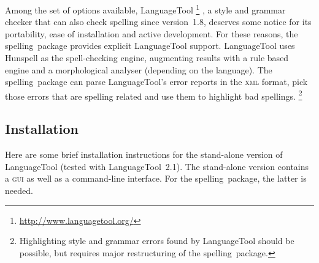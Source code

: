 \documentclass[11pt]{article}
\newcommand*{\pkg}{\textsf{spelling}}
\newcommand*{\acr}[1]{\mbox{\scshape#1}}
\begin{document}
Among the set of options available, LanguageTool%
\footnote{\url{http://www.languagetool.org/}}%
%
, a style and grammar checker that can also check spelling since
version~1.8, deserves some notice for its portability, ease of
installation and active development.  For these reasons, the \pkg\
package provides explicit LanguageTool support.  LanguageTool uses
Hunspell as the spell-checking engine, augmenting results with a rule
based engine and a morphological analyser (depending on the language).
The \pkg\ package can parse LanguageTool's error reports in the
\acr{xml} format, pick those errors that are spelling related and use
them to highlight bad spellings.%
\footnote{Highlighting style and grammar errors found by LanguageTool
  should be possible, but requires major restructuring of the \pkg\
  package.}


\subsection{Installation}
\label{sec:lt-installation}

Here are some brief installation instructions for the stand-alone
version of LanguageTool (tested with LanguageTool~2.1).  The stand-alone
version contains a \acr{gui} as well as a command-line interface.  For
the \pkg\ package, the latter is needed.
\end{document}
